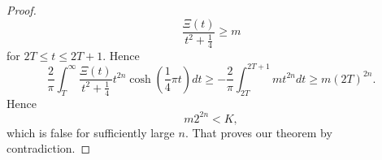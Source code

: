 \begin{proof}
\begin{equation*}
	\frac{\Xi(t)}{t^2 + \frac{1}{4}} \geq m
\end{equation*}
	for $2T \leq t \leq 2T + 1$. Hence
\begin{equation*}
	\frac{2}{\pi} \int _T ^{\infty} \frac{\Xi(t)}{t^2 + \frac{1}{4}} t^{2n} \cosh(\frac{1}{4} \pi t) dt \geq - \frac{2}{\pi} \int _{2T} ^{2T + 1} mt^{2n} dt \geq m(2T)^{2n}.
\end{equation*}
	Hence
\begin{equation*}
	m2^{2n} < K,
\end{equation*}
	which is false for sufficiently large $n$. That proves our theorem by contradiction.
\end{proof}